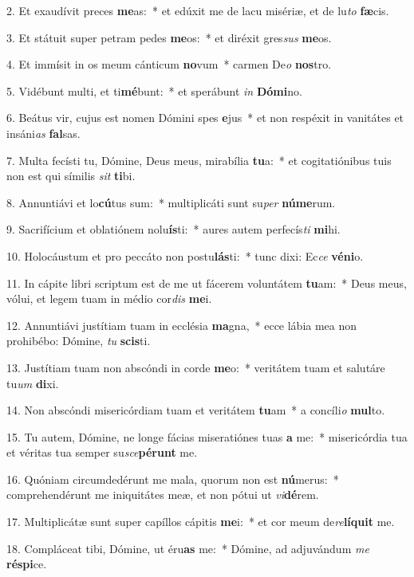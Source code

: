 2. Et exaudívit preces \textbf{me}as:~*  et edúxit me de lacu misériæ, et de lu\textit{to} \textbf{fæ}cis.\

3. Et státuit super petram pedes \textbf{me}os:~*  et diréxit gres\textit{sus} \textbf{me}os.\

4. Et immísit in os meum cánticum \textbf{no}vum~*  carmen De\textit{o} \textbf{nos}tro.\

5. Vidébunt multi, et ti\textbf{mé}bunt:~*  et sperábunt \textit{in} \textbf{Dó}\textbf{mi}no.\

6. Beátus vir, cujus est nomen Dómini spes \textbf{e}jus~*  et non respéxit in vanitátes et insáni\textit{as} \textbf{fal}sas.\

7. Multa fecísti tu, Dómine, Deus meus, mirabília \textbf{tu}a:~*  et cogitatiónibus tuis non est qui símilis \textit{sit} \textbf{ti}bi.\

8. Annuntiávi et lo\textbf{cú}tus sum:~*  multiplicáti sunt su\textit{per} \textbf{nú}\textbf{me}rum.\

9. Sacrifícium et oblatiónem nolu\textbf{ís}ti:~*  aures autem perfecís\textit{ti} \textbf{mi}hi.\

10. Holocáustum et pro peccáto non postu\textbf{lás}ti:~*  tunc dixi: Ec\textit{ce} \textbf{vé}\textbf{ni}o.\

11. In cápite libri scriptum est de me ut fácerem voluntátem \textbf{tu}am:~*  Deus meus, vólui, et legem tuam in médio cor\textit{dis} \textbf{me}i.\

12. Annuntiávi justítiam tuam in ecclésia \textbf{ma}gna,~*  ecce lábia mea non prohibébo: Dómine, \textit{tu} \textbf{scis}ti.\

13. Justítiam tuam non abscóndi in corde \textbf{me}o:~*  veritátem tuam et salutáre tu\textit{um} \textbf{di}xi.\

14. Non abscóndi misericórdiam tuam et veritátem \textbf{tu}am~*  a concíli\textit{o} \textbf{mul}to.\

15. Tu autem, Dómine, ne longe fácias miseratiónes tuas \textbf{a} me:~*  misericórdia tua et véritas tua semper su\textit{sce}\textbf{pé}\textbf{runt} me.\

16. Quóniam circumdedérunt me mala, quorum non est \textbf{nú}merus:~*  comprehendérunt me iniquitátes meæ, et non pótui ut \textit{vi}\textbf{dé}rem.\

17. Multiplicátæ sunt super capíllos cápitis \textbf{me}i:~*  et cor meum de\textit{re}\textbf{lí}\textbf{quit} me.\

18. Compláceat tibi, Dómine, ut éru\textbf{as} me:~*  Dómine, ad adjuvándum \textit{me} \textbf{ré}\textbf{spi}ce.\

